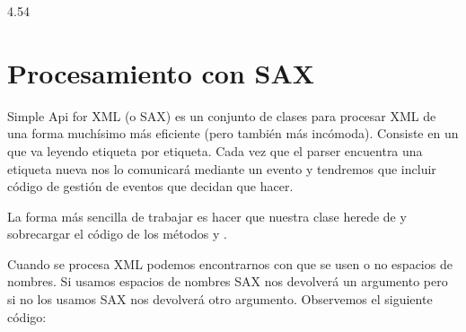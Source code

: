 \documentclass[letterpaper,10pt,spanish]{sphinxmanual}
\begin{document}
\begin{sphinxVerbatim}[commandchars=\\\{\}]
         
                4.54\PYGZpc{}
\end{sphinxVerbatim}


\section{Procesamiento con SAX}
\label{\detokenize{tema6:procesamiento-con-sax}}
Simple Api for XML (o SAX) es un conjunto de clases para procesar XML de una forma muchísimo más eficiente (pero también más incómoda). Consiste en un  que va leyendo etiqueta por etiqueta. Cada vez que el parser encuentra una etiqueta nueva nos lo comunicará mediante un evento y tendremos que incluir código de gestión de eventos que decidan que hacer.

La forma más sencilla de trabajar es hacer que nuestra clase herede de  y sobrecargar el código de los métodos  y .

Cuando se procesa XML podemos encontrarnos con que se usen o no espacios de nombres. Si usamos espacios de nombres SAX nos devolverá un argumento pero si no los usamos SAX nos devolverá otro argumento. Observemos el siguiente código:

\begin{sphinxVerbatim}[commandchars=\\\{\}]
    

    
         
       
       
       
\end{sphinxVerbatim}
\end{document}
